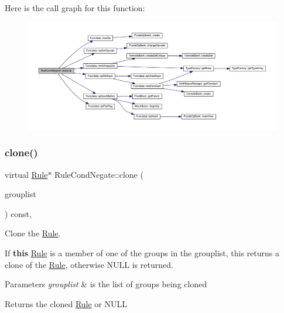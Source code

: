 Here is the call graph for this function\+:
\nopagebreak
\begin{figure}[H]
\begin{center}
\leavevmode
\includegraphics[width=350pt]{class_rule_cond_negate_a085f7cbc001d8d211be810d8578f4b7a_cgraph}
\end{center}
\end{figure}
\mbox{\label{class_rule_cond_negate_aebb1cb7788a492ef797489ea261a81a4}} 
\subsubsection{\texorpdfstring{clone()}{clone()}}
{\footnotesize\ttfamily virtual \mbox{\hyperlink{class_rule}{Rule}}$\ast$ Rule\+Cond\+Negate\+::clone (\begin{DoxyParamCaption}\item[{const \mbox{\hyperlink{class_action_group_list}{Action\+Group\+List}} \&}]{grouplist }\end{DoxyParamCaption}) const\hspace{0.3cm}{\ttfamily [inline]}, {\ttfamily [virtual]}}



Clone the \mbox{\hyperlink{class_rule}{Rule}}. 

If {\bfseries{this}} \mbox{\hyperlink{class_rule}{Rule}} is a member of one of the groups in the grouplist, this returns a clone of the \mbox{\hyperlink{class_rule}{Rule}}, otherwise N\+U\+LL is returned. 
\begin{DoxyParams}{Parameters}
{\em grouplist} & is the list of groups being cloned \\
\hline
\end{DoxyParams}
\begin{DoxyReturn}{Returns}
the cloned \mbox{\hyperlink{class_rule}{Rule}} or N\+U\+LL 
\end{DoxyReturn}


